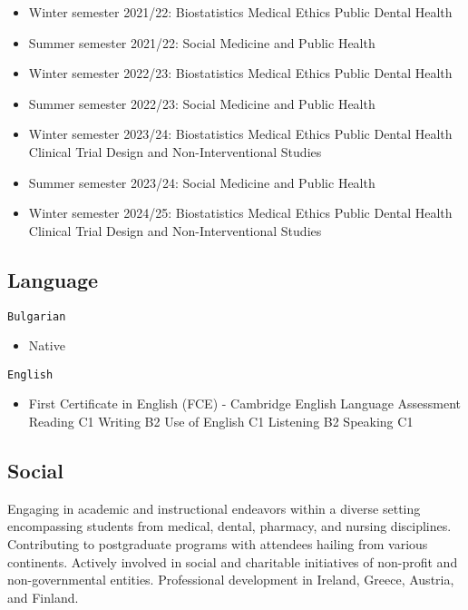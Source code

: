 \documentclass[
  12pt,
  letterpaper,
  DIV=11,
  numbers=noendperiod]{scrartcl}
\providecommand{\tightlist}{%
  \setlength{\itemsep}{0pt}\setlength{\parskip}{0pt}}\usepackage{longtable,booktabs,array}
\begin{document}
\begin{itemize}
\item
  Winter semester 2021/22: Biostatistics \textbar{} Medical Ethics
  \textbar{} Public Dental Health
\item
  Summer semester 2021/22: Social Medicine and Public Health
\item
  Winter semester 2022/23: Biostatistics \textbar{} Medical Ethics
  \textbar{} Public Dental Health
\item
  Summer semester 2022/23: Social Medicine and Public Health
\item
  Winter semester 2023/24: Biostatistics \textbar{} Medical Ethics
  \textbar{} Public Dental Health \textbar{} Clinical Trial Design and
  Non-Interventional Studies
\item
  Summer semester 2023/24: Social Medicine and Public Health
\item
  Winter semester 2024/25: Biostatistics \textbar{} Medical Ethics
  \textbar{} Public Dental Health \textbar{} Clinical Trial Design and
  Non-Interventional Studies
\end{itemize}

\subsection{Language}\label{language}

\texttt{Bulgarian}

\begin{itemize}
\tightlist
\item
  Native
\end{itemize}

\texttt{English}

\begin{itemize}
\tightlist
\item
  First Certificate in English (FCE) - Cambridge English Language
  Assessment \textbar{} Reading C1 \textbar{} Writing B2 \textbar{} Use
  of English C1 \textbar{} Listening B2 \textbar{} Speaking C1
\end{itemize}

\subsection{Social}\label{social}

Engaging in academic and instructional endeavors within a diverse
setting encompassing students from medical, dental, pharmacy, and
nursing disciplines. Contributing to postgraduate programs with
attendees hailing from various continents. Actively involved in social
and charitable initiatives of non-profit and non-governmental entities.
Professional development in Ireland, Greece, Austria, and Finland.
\end{document}
